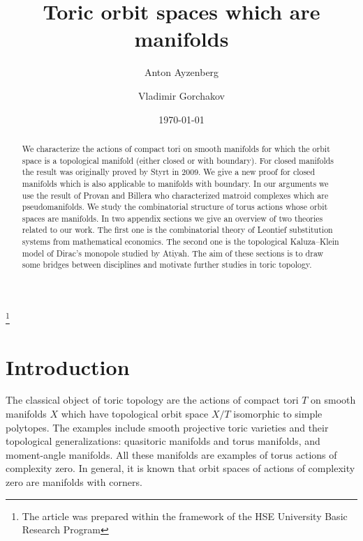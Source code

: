 \documentclass[english,12pt,oneside]{amsproc}
\numberwithin{equation}{section}
\theoremstyle{plain}
\theoremstyle{definition}
\theoremstyle{remark}
\begin{document}
\title{Toric orbit spaces which are manifolds}

\author{Anton Ayzenberg}
\address{Faculty of computer science, Higher School of Economics
}

\author{Vladimir Gorchakov}
\address{Faculty of computer science, Higher School of Economics}

\date{\today}
\thanks{The article was prepared within the framework of the HSE University Basic Research Program}



\begin{abstract}
We characterize the actions of compact tori on smooth manifolds for which the orbit space is a topological manifold (either closed or with boundary). For closed manifolds the result was originally proved by Styrt in 2009. We give a new proof for closed manifolds which is also applicable to manifolds with boundary. In our arguments we use the result of Provan and Billera who characterized matroid complexes which are pseudomanifolds. We study the combinatorial structure of torus actions whose orbit spaces are manifolds. In two appendix sections we give an overview of two theories related to our work. The first one is the combinatorial theory of Leontief substitution systems from mathematical economics. The second one is the topological Kaluza--Klein model of Dirac's monopole studied by Atiyah. The aim of these sections is to draw some bridges between disciplines and motivate further studies in toric topology.
\end{abstract}

\maketitle


\section{Introduction}\label{secIntro}

The classical object of toric topology are the actions of compact tori $T$ on smooth manifolds $X$ which have topological orbit space $X/T$ isomorphic to simple polytopes. The examples include smooth projective toric varieties and their topological generalizations: quasitoric manifolds and torus manifolds, and moment-angle manifolds. All these manifolds are examples of torus actions of complexity zero. In general, it is known that orbit spaces of actions of complexity zero are manifolds with corners.
\end{document}

